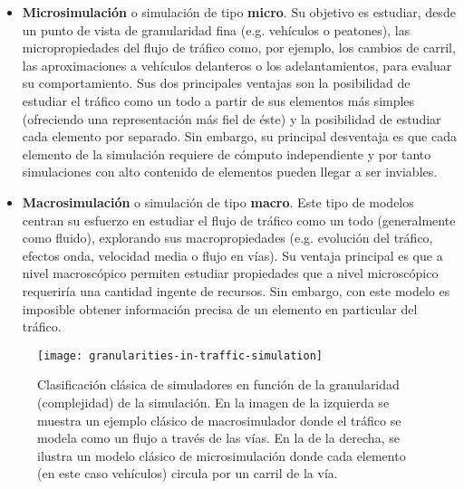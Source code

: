 \begin{itemize}
	\item \textbf{Microsimulación} o simulación de tipo \textbf{micro}. Su objetivo es estudiar, desde un punto de vista de granularidad fina (e.g. vehículos o peatones), las micropropiedades del flujo de tráfico como, por ejemplo, los cambios de carril, las aproximaciones a vehículos delanteros o los adelantamientos, para evaluar su comportamiento. Sus dos principales ventajas son la posibilidad de estudiar el tráfico como un todo a partir de sus elementos más simples (ofreciendo una representación más fiel de éste) y la posibilidad de estudiar cada elemento por separado. Sin embargo, su principal desventaja es que cada elemento de la simulación requiere de cómputo independiente y por tanto simulaciones con alto contenido de elementos pueden llegar a ser inviables.
	\item \textbf{Macrosimulación} o simulación de tipo \textbf{macro}. Este tipo de modelos centran su esfuerzo en estudiar el flujo de tráfico como un todo (generalmente como fluido), explorando sus macropropiedades (e.g. evolución del tráfico, efectos onda, velocidad media o flujo en vías). Su ventaja principal es que a nivel macroscópico permiten estudiar propiedades que a nivel microscópico requeriría una cantidad ingente de recursos. Sin embargo, con este modelo es imposible obtener información precisa de un elemento en particular del tráfico.
\end{itemize}

\begin{figure}
	\centering
	\texttt{[image: granularities-in-traffic-simulation]}
	\caption[Clasificación de simuladores según granularidad]{Clasificación clásica de simuladores en función de la granularidad (complejidad) de la simulación. En la imagen de la izquierda se muestra un ejemplo clásico de macrosimulador donde el tráfico se modela como un flujo a través de las vías. En la de la derecha, se ilustra un modelo clásico de microsimulación donde cada elemento (en este caso vehículos) circula por un carril de la vía.}
	\label{fig:granularities-in-traffic-simulation}
\end{figure}

